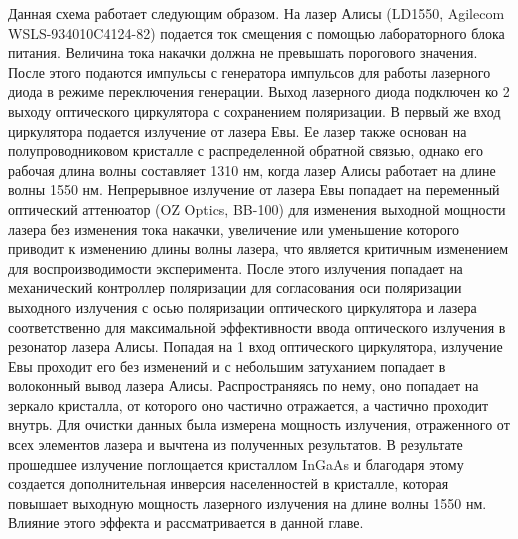 Данная схема работает следующим образом. На лазер Алисы (LD1550, Agilecom WSLS-934010C4124-82) подается ток смещения с помощью лабораторного блока питания. Величина тока накачки должна не превышать порогового значения. После этого подаются импульсы с генератора импульсов для работы лазерного диода в режиме переключения генерации. Выход лазерного диода подключен ко 2 выходу оптического циркулятора с сохранением поляризации. В первый же вход циркулятора подается излучение от лазера Евы. Ее лазер также основан на полупроводниковом кристалле с распределенной обратной связью, однако его рабочая длина волны составляет 1310 нм, когда лазер Алисы работает на длине волны 1550 нм. Непрерывное излучение от лазера Евы попадает на переменный оптический аттенюатор (OZ Optics, BB-100) для изменения выходной мощности лазера без изменения тока накачки, увеличение или уменьшение которого приводит к изменению длины волны лазера, что является критичным изменением для воспроизводимости эксперимента. После этого излучения попадает на механический контроллер поляризации для согласования оси поляризации выходного излучения с осью поляризации оптического циркулятора и лазера соответственно для максимальной эффективности ввода оптического излучения в резонатор лазера Алисы. Попадая на 1 вход оптического циркулятора, излучение Евы проходит его без изменений и с небольшим затуханием попадает в волоконный вывод лазера Алисы. Распространяясь по нему, оно попадает на зеркало кристалла, от которого оно частично отражается, а частично проходит внутрь. Для очистки данных была измерена мощность излучения, отраженного от всех элементов лазера и вычтена из полученных результатов. В результате прошедшее излучение поглощается кристаллом InGaAs и благодаря этому создается дополнительная инверсия населенностей в кристалле, которая повышает выходную мощность лазерного излучения на длине волны 1550 нм. Влияние этого эффекта и рассматривается в данной главе. 

